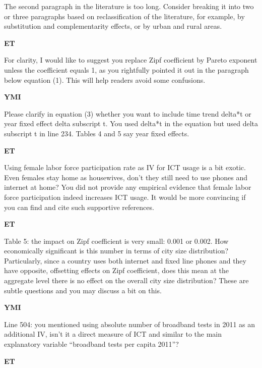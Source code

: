 \documentclass[11pt, a4paper, answers]{exam}
\begin{document}
\begin{questions}
\question The second paragraph in the literature is too long. Consider breaking 
it into two or three paragraphs based on reclassification of the literature, for example, 
by substitution and complementarity effects, or by urban and rural areas.

\begin{solution}
\textbf{ET}
\end{solution}

\question For clarity, I would like to suggest you replace Zipf coefficient by Pareto 
exponent unless the coefficient equals 1, as you rightfully pointed it out in the 
paragraph below equation (1). This will help readers avoid some confusions.

\begin{solution}
\textbf{YMI}
\end{solution}

\question Please clarify in equation (3) whether you want to include time trend 
delta*t or year fixed effect delta subscript t. You used delta*t in the equation 
but used delta subscript t in line 234. Tables 4 and 5 say year fixed effects.

\begin{solution}
\textbf{ET}
\end{solution}

\question Using female labor force participation rate as IV for ICT usage is a bit 
exotic. Even females stay home as housewives, don’t they still need to use phones 
and internet at home? You did not provide any empirical evidence that female labor 
force participation indeed increases ICT usage. It would be more convincing if 
you can find and cite such supportive references.  

\begin{solution}
\textbf{ET}
\end{solution}

\question Table 5: the impact on Zipf coefficient is very small: 0.001 or 0.002. 
How economically significant is this number in terms of city size distribution? 
Particularly, since a country uses both internet and fixed line phones and they 
have opposite, offsetting effects on Zipf coefficient, does this mean at the 
aggregate level there is no effect on the overall city size distribution? 
These are subtle questions and you may discuss a bit on this.

\begin{solution}
\textbf{YMI}
\end{solution}

\question Line 504: you mentioned using absolute number of broadband tests 
in 2011 as an additional IV, isn’t it a direct measure of ICT and similar 
to the main explanatory variable “broadband tests per capita 2011”?

\begin{solution}
\textbf{ET}
\end{solution}

\end{questions}
\end{document}
